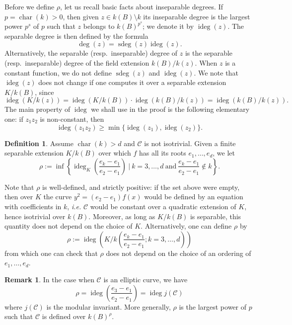 \documentclass[11pt]{article}
\theoremstyle{plain}
\theoremstyle{definition}
\newtheorem{definition}[theorem]{Definition}
\newtheorem{remark}[theorem]{Remark}
\DeclareMathOperator{\degi}{ideg}
\DeclareMathOperator{\degs}{sdeg}
\DeclareMathOperator{\car}{char}
\begin{document}
Before we define $\rho$, let us recall basic facts about inseparable degrees. If $p=\car(k)>0$, then given $z\in k(B)\setminus k$ its inseparable degree is the largest power $p^s$ of $p$ such that $z$ belongs to $k(B)^{p^s}$; we denote it by $\degi(z)$. The separable degree is then defined by the formula
$$
\deg(z) = \degs(z)\degi(z).
$$
Alternatively, the separable (resp.\ inseparable) degree of $z$ is the separable (resp.\ inseparable) degree of the field extension $k(B)/k(z)$. When $z$ is a constant function, we do not define $\degs(z)$ and $\degi(z)$. We note that $\degi(z)$ does not change if one computes it over a separable extension $K/k(B)$, since
$$
\degi(K/k(z))= \degi(K/k(B))\cdot \degi(k(B)/k(z)) = \degi(k(B)/k(z)).
$$
The main property of $\degi$ we shall use in the proof is the following elementary one: if $z_1z_2$ is non-constant, then
\begin{equation}
\label{eq:insepdegprod}
\degi(z_1z_2) \geq \min \{\degi(z_1), \degi(z_2)\}.
\end{equation}


\begin{definition}
\label{def:insepdeg}
Assume $\car(k)>d$ and $\mathcal{C}$ is not isotrivial.
Given a finite separable extension $K/k(B)$ over which $f$ has all its roots $e_1,\dots, e_d$, we let
$$
\rho :=\inf\left\{\degi_K\left(\frac{e_k - e_1}{e_2 - e_1}\right) ~|~ k=3,\dots,d ~\text{and}~ \frac{e_k - e_1}{e_2 - e_1} \notin k \right\}.
$$
\end{definition}

Note that $\rho$ is well-defined, and strictly positive: if the set above were empty, then over $K$ the curve $y^2=(e_2-e_1)f(x)$ would be defined by an equation with coefficients in $k$, \emph{i.e.} $\mathcal{C}$ would be constant over a quadratic extension of $K$, hence isotrivial over $k(B)$. Moreover, as long as $K/k(B)$ is separable, this quantity does not depend on the choice of $K$.
Alternatively, one can define $\rho$ by
$$
\rho := \degi\left(K/k\left(\frac{e_k - e_1}{e_2 - e_1}; k=3,\dots,d\right)\right)
$$
from which one can check that $\rho$ does not depend on the choice of an ordering of $e_1,\dots,e_d$.



\begin{remark}
In the case when $\mathcal{C}$ is an elliptic curve, we have
$$
\rho = \degi\left(\frac{e_3 - e_1}{e_2 - e_1}\right) = \degi j(\mathcal{C})
$$
where $j(\mathcal{C})$ is the modular invariant. More generally, $\rho$ is the largest power of $p$ such that $\mathcal{C}$ is defined over $k(B)^\rho$.
\end{remark}
\end{document}

